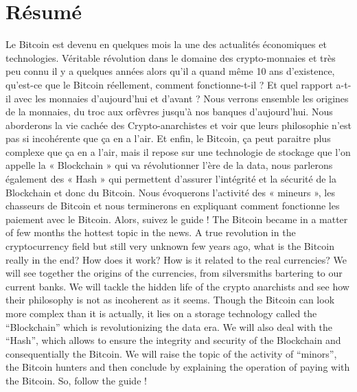 \documentclass{bredele} %
\begin{document}
    \chapter*{Résumé}
    Le Bitcoin est devenu en quelques mois la une des actualités économiques et technologies. Véritable révolution dans le domaine des crypto-monnaies et très peu connu il y a quelques années alors qu’il a quand même 10 ans d’existence, qu’est-ce que le Bitcoin réellement, comment fonctionne-t-il ? Et quel rapport a-t-il avec les monnaies d’aujourd’hui et d’avant ?
    \newline
    Nous verrons ensemble les origines de la monnaies, du troc aux orfèvres jusqu’à nos banques d’aujourd’hui. Nous aborderons la vie cachée des Crypto-anarchistes et voir que leurs philosophie n’est pas si incohérente que ça en a l’air. Et enfin, le Bitcoin, ça peut paraitre plus complexe que ça en a l’air, mais il repose sur une technologie de stockage que l’on appelle la « Blockchain » qui va révolutionner l’ère de la data, nous parlerons également des « Hash » qui permettent d’assurer l’intégrité et la sécurité de la Blockchain et donc du Bitcoin. Nous évoquerons l’activité des « mineurs », les chasseurs de Bitcoin et nous terminerons en expliquant comment fonctionne les paiement avec le Bitcoin. Alors, suivez le guide !
    \newline
    \newline
    The Bitcoin became in a matter of few months the hottest topic in the news. A true revolution in the cryptocurrency field but still very unknown few years ago, what is the Bitcoin really in the end? How does it work? How is it related to the real currencies?
    \newline
    We will see together the origins of the currencies, from silversmiths bartering to our current banks. We will tackle the hidden life of the crypto anarchists and see how their philosophy is not as incoherent as it seems. Though the Bitcoin can look more complex than it is actually, it lies on a storage technology called the “Blockchain” which is revolutionizing the data era. We will also deal with the “Hash”, which allows to ensure the integrity and security of the Blockchain and consequentially the Bitcoin. We will raise the topic of the activity of “minors”, the Bitcoin hunters and then conclude by explaining the operation of paying with the Bitcoin. So, follow the guide !
    \mainmatter
\end{document}
